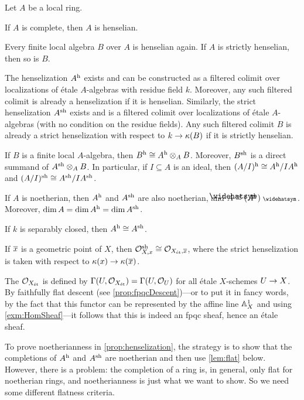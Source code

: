 \begin{prop}\label{prop:henselization}
	Let $A$ be a local ring.
	\begin{alphanumerate}
		\item If $A$ is complete, then $A$ is henselian.
		\item Every finite local algebra $B$ over $A$ is henselian again. If $A$ is strictly henselian, then so is $B$.
		\item The henselization $A^{\mathrm{h}}$ exists and can be constructed as a filtered colimit over localizations of étale $A$-algebras with residue field $k$. Moreover, any such filtered colimit is already a henselization if it is henselian. Similarly, the strict henselization $A^{\mathrm{sh}}$ exists and is a filtered colimit over localizations of étale $A$-algebras (with no condition on the residue fields). Any such filtered colimit $B$ is already a strict henselization with respect to $k\morphism \kappa(B)$ if it is strictly henselian.
		\item If $B$ is a finite local $A$-algebra, then $B^{\mathrm{h}}\cong A^{\mathrm{h}}\otimes_AB$. Moreover, $B^{\mathrm{sh}}$ is a direct summand of $A^{\mathrm{sh}}\otimes_AB$. In particular, if $I\subseteq A$ is an ideal, then $(A/I)^{\mathrm{h}}\cong A^{\mathrm{h}}/IA^{\mathrm{h}}$ and $(A/I)^{\mathrm{sh}}\cong A^{\mathrm{sh}}/IA^{\mathrm{sh}}$.
		\item If $A$ is noetherian, then $A^{\mathrm{h}}$ and $A^{\mathrm{sh}}$ are also noetherian, and $\roof{A}\cong (A^\h)^\complete$. Moreover, $\dim A=\dim A^{\mathrm{h}}=\dim A^{\mathrm{sh}}$.
		\item If $k$ is separably closed, then $A^{\mathrm{h}}\cong A^{\mathrm{sh}}$.
		\item If $\ov{x}$ is a geometric point of $X$, then $\Oo_{X,x}^\sh\cong \Oo_{X_\et,\ov{x}}$, where the strict henselization is taken with respect to $\kappa(x)\morphism \kappa(\ov{x})$.
	\end{alphanumerate}
\end{prop}
\begin{rem}
	The  $\mathcal{O}_{X_{\mathrm{\acute{e}t}}}$ is defined by $\operatorname{\Gamma}(U,\mathcal{O}_{X_{\mathrm{\acute{e}t}}})=\operatorname{\Gamma}(U,\mathcal{O}_U)$ for all étale $X$-schemes $U\morphism X$. By faithfully flat descent (see \cref{prop:fpqcDescent})---or to put it in fancy words, by the fact that this functor can be represented by the affine line $\mathbb{A}_X^1$ and using \cref{exm:HomSheaf}---it follows that this is indeed an fpqc sheaf, hence an étale sheaf.
\end{rem}
To prove noetherianness in \cref{prop:henselization}, the strategy is to show that the completions of $A^{\mathrm{h}}$ and $A^{\mathrm{sh}}$ are noetherian and then use \cref{lem:flat} below. However, there is a problem: the completion of a ring is, in general, only flat for noetherian rings, and noetherianness is just what we want to show. So we need some different flatness criteria.
